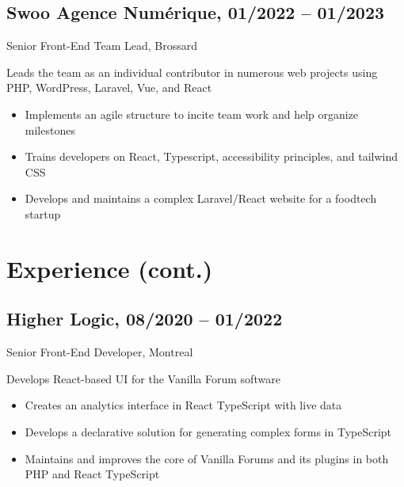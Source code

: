 \documentclass{article}
\begin{document}
\begin{paracol}{2}
\begin{rightcolumn}
    \vspace{1em}

    \subsection{Swoo Agence Numérique, 01/2022 -- 01/2023}
    {Senior Front-End Team Lead, Brossard\par}
    {
      Leads the team as an individual contributor in numerous web projects using PHP, WordPress, Laravel, Vue, and React
    \par}
    \begin{itemize}
      \item Implements an agile structure to incite team work and help organize milestones
      \item Trains developers on React, Typescript, accessibility principles, and tailwind CSS
      \item Develops and maintains a complex Laravel/React website for a foodtech startup
    \end{itemize}

    \pagebreak
    \section{Experience (cont.)}

    \subsection{Higher Logic, 08/2020 -- 01/2022}
    {Senior Front-End Developer, Montreal\par}
    {
      Develops React-based UI for the Vanilla Forum software
    \par}
    \begin{itemize}
      \item Creates an analytics interface in React TypeScript with live data
      \item Develops a declarative solution for generating complex forms in TypeScript
      \item Maintains and improves the core of Vanilla Forums and its plugins in both PHP and React TypeScript
    \end{itemize}

    \vspace{1em}


\end{rightcolumn}
\end{paracol}
\end{document}
